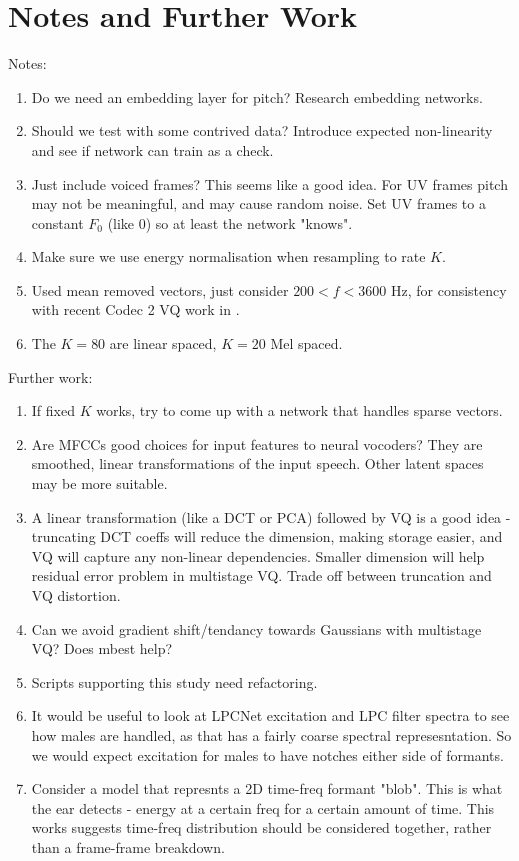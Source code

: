 \documentclass{article}
\begin{document}
\section{Notes and Further Work}

Notes:
\begin{enumerate}
\item Do we need an embedding layer for pitch?  Research embedding networks.
\item Should we test with some contrived data?  Introduce expected non-linearity and see if network can train as a check.
\item Just include voiced frames?  This seems like a good idea.  For UV frames pitch may not be meaningful, and may cause random noise. Set UV frames to a constant $F_0$ (like 0) so at least the network "knows".
\item Make sure we use energy normalisation \cite{rowe2023_ratek_study} when resampling to rate $K$.
\item Used mean removed vectors, just consider $200 < f < 3600$ Hz, for consistency with recent Codec 2 VQ work in \cite{rowe2023_ratek_study}.
\item The $K=80$ are linear spaced, $K=20$ Mel spaced.
\end{enumerate}

Further work:
\begin{enumerate}
\item If fixed $K$ works, try to come up with a network that handles sparse vectors.
\item Are MFCCs good choices for input features to neural vocoders? They are smoothed, linear transformations of the input speech.  Other latent spaces may be more suitable.
\item A linear transformation (like a DCT or PCA) followed by VQ is a good idea - truncating DCT coeffs will reduce the dimension, making storage easier, and VQ will capture any non-linear dependencies.  Smaller dimension will help residual error problem in multistage VQ. Trade off between truncation and VQ distortion.
\item Can we avoid gradient shift/tendancy towards Gaussians with multistage VQ?  Does mbest help?
\item Scripts supporting this study need refactoring.
\item It would be useful to look at LPCNet excitation and LPC filter spectra to see how males are handled, as that has a fairly coarse spectral represesntation.  So we would expect excitation for males to have notches either side of formants.
\item Consider a model that represnts a 2D time-freq formant "blob".  This is what the ear detects - energy at a certain freq for a certain amount of time.  This works suggests time-freq distribution should be considered together, rather than a frame-frame breakdown.
\end{enumerate}



\end{document}
